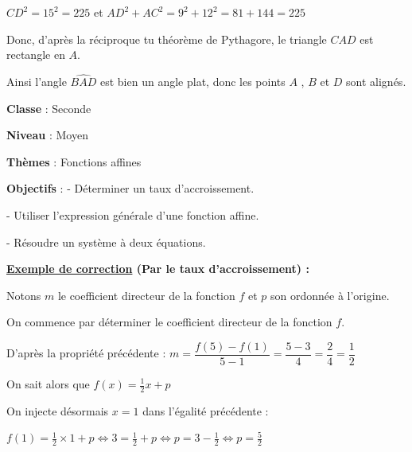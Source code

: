 \documentclass[oneside,12pt]{article}
\begin{document}
$CD^2=15^2=225$ \qquad et \qquad $AD^2+AC^2=9^2+12^2=81+144=225$

Donc, d'après la réciproque tu théorème de Pythagore, le triangle $CAD$ est rectangle en $A$.

Ainsi l'angle $\widehat{BAD}$ est bien un angle plat, donc les points $A$ , $B$ et $D$ sont alignés.




\newpage


\textbf{Classe} : Seconde

\textbf{Niveau} : Moyen

\textbf{Thèmes} : Fonctions affines

\textbf{Objectifs} : - Déterminer un taux d'accroissement.

			\hspace{20.5mm} - Utiliser l'expression générale d'une fonction affine.
			
			\hspace{20.5mm} - Résoudre un système à deux équations.







\textbf{\underline{Exemple de correction} (Par le taux d'accroissement) :}

Notons $m$ le coefficient directeur de la fonction $f$ et $p$ son ordonnée à l'origine.

On commence par déterminer le coefficient directeur de la fonction $f$.

D'après la propriété précédente : $m=\dfrac{f(5)-f(1)}{5-1}=\dfrac{5-3}{4}=\dfrac{2}{4}=\dfrac{1}{2}$

On sait alors que $f(x)=\frac{1}{2}x+p$

On injecte désormais $x=1$ dans l'égalité précédente :

$f(1)=\frac{1}{2}\times 1 + p \Longleftrightarrow 3 = \frac{1}{2} + p \Longleftrightarrow p = 3-\frac{1}{2} \Longleftrightarrow p=\frac{5}{2}$
\end{document}
